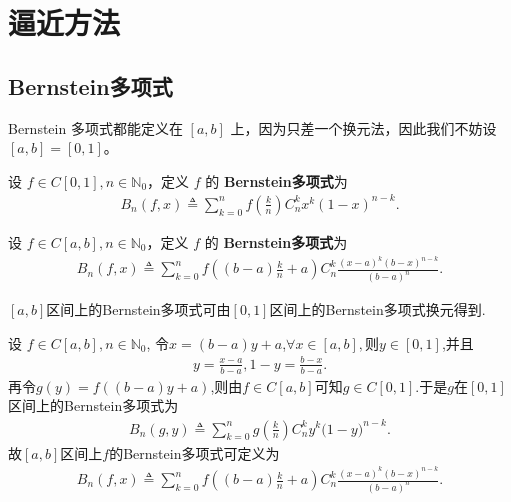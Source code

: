 \documentclass[../../main.tex]{subfiles}
\begin{document}
\section{逼近方法}

\subsection{Bernstein多项式}

Bernstein 多项式都能定义在 $[a,b]$ 上，因为只差一个换元法，因此我们不妨设 $[a,b]=[0,1]$。

\begin{definition}\label{definition:一维Bernstein多项式}
设 $f \in C[0,1], n \in \mathbb{N}_0$，定义 $f$ 的 \textbf{Bernstein多项式}为
\begin{align*}
B_n(f,x) \triangleq \sum_{k = 0}^{n} f\left(\frac{k}{n}\right) C_{n}^{k} x^{k} (1 - x)^{n - k}.
\end{align*} 

设 $f \in C[a,b], n \in \mathbb{N}_0$，定义 $f$ 的 \textbf{Bernstein多项式}为
\begin{align*}
B_n(f,x)\triangleq \sum_{k=0}^n{f\left( \left( b-a \right) \frac{k}{n}+a \right) C_{n}^{k}\frac{\left( x-a \right) ^k\left( b-x \right) ^{n-k}}{\left( b-a \right) ^n}}.
\end{align*} 
\end{definition}
\begin{remark}
$[a,b]$区间上的Bernstein多项式可由$[0,1]$区间上的Bernstein多项式换元得到.

设 $f \in C[a,b], n \in \mathbb{N}_0$,
令$x=(b-a)y+a$,$\forall x\in [a,b],$则$y\in [0,1]$,并且
\begin{align*}
y=\frac{x-a}{b-a},1-y=\frac{b-x}{b-a}.
\end{align*}
再令$g(y)=f((b-a)y+a)$,则由$f\in C[a,b]$可知$g\in C[0,1]$.于是$g$在$[0,1]$区间上的Bernstein多项式为
\begin{align*}
B_n(g,y)\triangleq \sum_{k=0}^n{g\left( \frac{k}{n} \right) C_{n}^{k}y^k(1}-y)^{n-k}.
\end{align*}
故$[a,b]$区间上$f$的Bernstein多项式可定义为
\begin{align*}
B_n(f,x) \triangleq \sum_{k=0}^n{f\left( \left( b-a \right) \frac{k}{n}+a \right) C_{n}^{k}\frac{\left( x-a \right) ^k\left( b-x \right) ^{n-k}}{\left( b-a \right) ^n}}.
\end{align*}
\end{remark}
\end{document}
